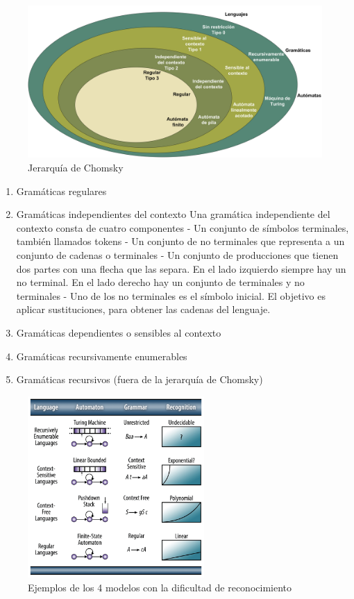 \begin{figure}[hp!]
    \centering
    \includegraphics[width=1.0\textwidth]{imaxes/c-bases-teoricas/niveles-chomsky.png}
    \caption{Jerarquía de Chomsky}
    \label{fig:niveles-chomsky}
\end{figure}

\begin{enumerate}
    \item Gramáticas regulares
    \item Gramáticas independientes del contexto
   Una gramática independiente del contexto consta de cuatro componentes
   - Un conjunto de símbolos terminales, también llamados tokens
   - Un conjunto de no terminales que representa a un conjunto de cadenas o terminales
    - Un conjunto de producciones que tienen dos partes con una flecha que las separa. En el lado izquierdo siempre hay un no terminal. En el lado derecho hay un conjunto de terminales y no terminales
    - Uno de los no terminales es el símbolo inicial.
    El objetivo es aplicar sustituciones, para obtener las cadenas del lenguaje.
    
    \item Gramáticas dependientes o sensibles al contexto
    \item Gramáticas recursivamente enumerables
    \item Gramáticas recursivos (fuera de la jerarquía de Chomsky)
\end{enumerate}

\begin{figure}[hp!]
    \centering
    \includegraphics[width=0.6\textwidth]{imaxes/c-bases-teoricas/hauser-2016.png}
    \caption{Ejemplos de los 4 modelos con la dificultad de reconocimiento \cite{teoriaCompiladores_hauser_automatas}}
    \label{fig:hauser-2016}
\end{figure}


